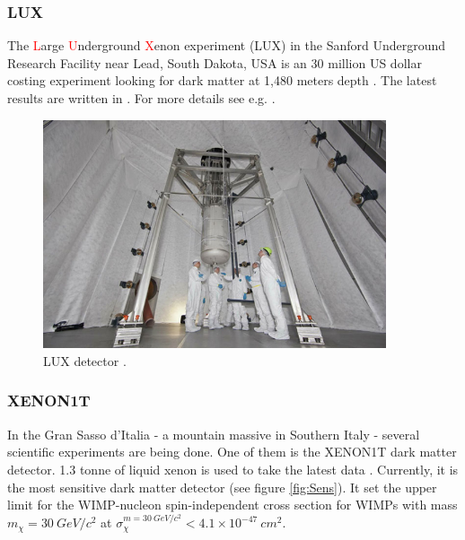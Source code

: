 \documentclass{article}
\begin{document}
\subsubsection{LUX}
\label{sec:LUX}The \textcolor{red}{L}arge \textcolor{red}{U}nderground \textcolor{red}{X}enon experiment (LUX) in the Sanford Underground Research Facility near Lead, South Dakota, USA is an 30 million US dollar costing experiment looking for dark matter at 1,480 meters depth \cite{Reich2013}. The latest results are written in \cite{Akerib:2016vxi}. For more details see e.g. \cite{Akerib:2012ys}.


\begin{figure}[h]
    \centering
    \includegraphics[width=0.9\textwidth]{lux.jpg}
    \caption{LUX detector \cite{PhysWorld}.}
    \label{fig:LUX}
\end{figure}

\subsubsection{XENON1T}
\label{sec:XENON}In the Gran Sasso d'Italia - a mountain massive in Southern Italy - several scientific experiments are being done. One of them is the XENON1T dark matter detector. 1.3 tonne of liquid xenon is used to take the latest data \cite{Aprile:2018dbl}. Currently, it is the most sensitive dark matter detector (see figure \ref{fig:Sens}). It set the upper limit for the WIMP-nucleon spin-independent cross section for WIMPs with mass $m_\chi =30\ GeV/c^2$ at $\sigma_\chi^{m=30\ GeV/c^2}<4.1\times 10^{-47}\ cm^2$.
\end{document}
